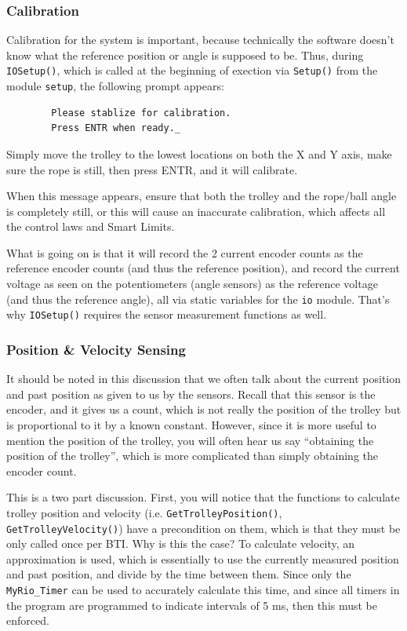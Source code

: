 \documentclass[letterpaper]{article}
\begin{document}
\subsubsection{Calibration}
Calibration for the system is important, because technically the software doesn't know what the reference position or angle is supposed to be. Thus, during \texttt{IOSetup()}, which is called at the beginning of exection via \texttt{Setup()} from the module \texttt{setup}, the following prompt appears:
\begin{center}
    \begin{lstlisting}
        Please stablize for calibration.
        Press ENTR when ready._
    \end{lstlisting}
\end{center}

Simply move the trolley to the lowest locations on both the X and Y axis, make sure the rope is still, then press ENTR, and it will calibrate.
\begin{tcolorbox}[colframe=red!75!black,colback=yellow!5, title=WARNING]
    When this message appears, ensure that both the trolley and the rope/ball angle is completely still, or this will cause an inaccurate calibration, which affects all the control laws and Smart Limits.
\end{tcolorbox}

What is going on is that it will record the 2 current encoder counts as the reference encoder counts (and thus the reference position), and record the current voltage as seen on the potentiometers (angle sensors) as the reference voltage (and thus the reference angle), all via static variables for the \texttt{io} module. That's why \texttt{IOSetup()} requires the sensor measurement functions as well.

\subsubsection{Position \& Velocity Sensing}
It should be noted in this discussion that we often talk about the current position and past position as given to us by the sensors. Recall that this sensor is the encoder, and it gives us a count, which is not really the position of the trolley but is proportional to it by a known constant. However, since it is more useful to mention the position of the trolley, you will often hear us say ``obtaining the position of the trolley'', which is more complicated than simply obtaining the encoder count.

This is a two part discussion. First, you will notice that the functions to calculate trolley position and velocity (i.e. \texttt{GetTrolleyPosition()}, \texttt{GetTrolleyVelocity()}) have a precondition on them, which is that they must be only called once per BTI. Why is this the case? To calculate velocity, an approximation is used, which is essentially to use the currently measured position and past position, and divide by the time between them. Since only the \texttt{MyRio\_Timer} can be used to accurately calculate this time, and since all timers in the program are programmed to indicate intervals of 5 ms, then this must be enforced.
\end{document}

